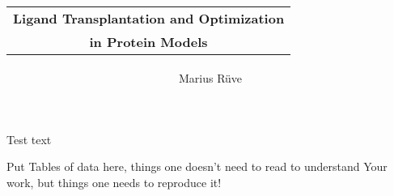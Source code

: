 \documentclass[twoside,a4paper]{master}
\begin{document}

\author{Marius R\"uve}
\title{
  \begin{tabular}{c}
    \textbf{Ligand Transplantation and Optimization} \\[3mm]
    \textbf{in Protein Models}
  \end{tabular}}
\Maketitle

\small
Test text \cite{bellmannTopologicalSimilaritySearch2021}

\normalsize

\setcounter{tocdepth}{1}
\tableofcontents






\newpage
\small
\printbibliography[title=References]
\normalsize


\appendix
\noappendicestocpagenum
\addappheadtotoc


Put Tables of data here, things one doesn't need to read to understand Your
work, but things one needs to reproduce it!



\Assertion
\end{document}
